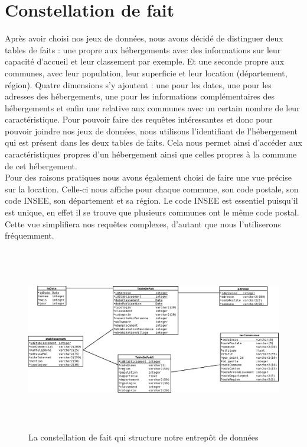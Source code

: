 \documentclass[a4paper,sffamily,12pt]{article}
\begin{document}
		\vspace{0.5cm}
		
	\section{Constellation de fait}

		\vspace{0.5cm}
			
		Après avoir choisi nos jeux de données, nous avons décidé de distinguer deux tables de faits : une propre aux hébergements avec des informations sur leur capacité d'accueil et leur classement par exemple. Et une seconde propre aux communes, avec leur population, leur superficie et leur location (département, région). Quatre dimensions s'y ajoutent : une pour les dates, une pour les adresses des hébergements, une pour les informations complémentaires des hébergements et enfin une relative aux communes avec un certain nombre de leur caractéristique. Pour pouvoir faire des requêtes intéressantes et donc pour pouvoir joindre nos jeux de données, nous utilisons l'identifiant de l'hébergement qui est présent dans les deux tables de faits. Cela nous permet ainsi d'accéder aux caractéristiques propres d'un hébergement ainsi que celles propres à la commune de cet hébergement. \\
		
		Pour des raisons pratiques nous avons également choisi de faire une vue précise sur la location. Celle-ci nous affiche pour chaque commune, son code postale, son code INSEE, son département et sa région. Le code INSEE est essentiel puisqu'il est unique, en effet il se trouve que plusieurs communes ont le même code postal. Cette vue simplifiera nos requêtes complexes, d'autant que nous l'utiliserons fréquemment. \\
	
		\vspace{0.5cm}
		
		\begin{figure}[!h]
				
			\centerline{\includegraphics[height=8cm]{picture/constellation_de_fait.png}}
			\caption{La constellation de fait qui structure notre entrepôt de données}
			\label{constellation}
			
		\end{figure}	
		
\end{document}
